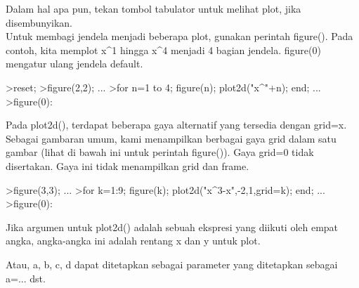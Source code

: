 \documentclass[12pt,arial,letterpaper]{book}
\begin{document}
\begin{eulercomment}
\begin{eulercomment}
\begin{eulercomment}
\begin{eulercomment}
\begin{eulercomment}
\begin{eulercomment}
\begin{eulercomment}
\begin{eulercomment}
\begin{eulercomment}
\begin{eulercomment}
\begin{eulercomment}
\begin{eulercomment}
\begin{eulercomment}
\begin{eulercomment}
\begin{eulercomment}
\begin{eulercomment}
\begin{eulercomment}
Dalam hal apa pun, tekan tombol tabulator untuk melihat plot, jika
disembunyikan.\\
Untuk membagi jendela menjadi beberapa plot, gunakan perintah
figure(). Pada contoh, kita memplot x\textasciicircum{}1 hingga x\textasciicircum{}4 menjadi 4 bagian
jendela. figure(0) mengatur ulang jendela default.
\end{eulercomment}
\begin{eulerprompt}
>reset;
>figure(2,2); ...
>for n=1 to 4; figure(n); plot2d("x^"+n); end; ...
>figure(0):
\end{eulerprompt}
\begin{eulercomment}
Pada plot2d(), terdapat beberapa gaya alternatif yang tersedia dengan
grid=x. Sebagai gambaran umum, kami menampilkan berbagai gaya grid
dalam satu gambar (lihat di bawah ini untuk perintah figure()). Gaya
grid=0 tidak disertakan. Gaya ini tidak menampilkan grid dan frame.
\end{eulercomment}
\begin{eulerprompt}
>figure(3,3); ...
>for k=1:9; figure(k); plot2d("x^3-x",-2,1,grid=k); end; ...
>figure(0):
\end{eulerprompt}
\begin{eulercomment}
Jika argumen untuk plot2d() adalah sebuah ekspresi yang diikuti oleh
empat angka, angka-angka ini adalah rentang x dan y untuk plot.

Atau, a, b, c, d dapat ditetapkan sebagai parameter yang ditetapkan
sebagai a=... dst.


\end{eulercomment}
\end{eulercomment}
\end{eulercomment}
\end{eulercomment}
\end{eulercomment}
\end{eulercomment}
\end{eulercomment}
\end{eulercomment}
\end{eulercomment}
\end{eulercomment}
\end{eulercomment}
\end{eulercomment}
\end{eulercomment}
\end{eulercomment}
\end{eulercomment}
\end{eulercomment}
\end{eulercomment}
\end{document}
